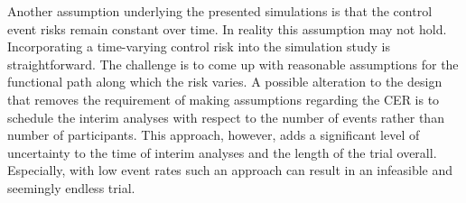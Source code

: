 \documentclass[12pt]{article}
\begin{document}
Another assumption underlying the presented simulations is that the control event risks remain constant over time. In reality this assumption may not hold. Incorporating a time-varying control risk into the simulation study is straightforward. The challenge is to come up with reasonable assumptions for the functional path along which the risk varies. A possible alteration to the design that removes the requirement of making assumptions regarding the CER is to schedule the interim analyses with respect to the number of events rather than number of participants. This approach, however, adds a significant level of uncertainty to the time of interim analyses and the length of the trial overall. Especially, with low event rates such an approach can result in an infeasible and seemingly endless trial. 


\newpage
%   

%


%	
%	
%		
%
%
\end{document}
